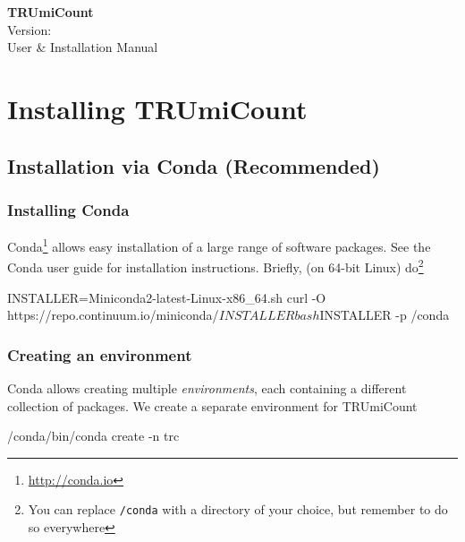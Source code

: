 \documentclass[10pt]{article}
\makeatletter
\newenvironment{shellcode}%
   {\bgroup\topsep=0pt\partopsep=0pt\shaded\verbatim}%
   {\endverbatim\endshaded\egroup}
\newcommand{\@version}{}
\newcommand{\printversion}{\@version}
\makeatother
\begin{document}
\begin{titlepage}
\vfill
{\sffamily\bfseries\Huge\centering%
TRUmiCount\\}
\vskip0.5cm
{\sffamily\large\centering%
Version: \printversion\\}
\vskip1.5cm
{\sffamily\huge\centering%
User \& Installation Manual\\}
\vskip4cm
\vfill
{\sffamily
\tableofcontents}
\vfill
\end{titlepage}



\newpage
\section{Installing TRUmiCount}

\subsection{Installation via Conda (Recommended)}

\subsubsection*{Installing Conda}

Conda\footnote{\url{http://conda.io}} allows easy installation of a large range of software packages. See the Conda user guide for installation instructions. Briefly, (on 64-bit Linux) do\footnote{You can replace \texttt{/conda} with a directory of your choice, but remember to do so everywhere}

\begin{shellcode}
INSTALLER=Miniconda2-latest-Linux-x86_64.sh
curl -O https://repo.continuum.io/miniconda/$INSTALLER
bash $INSTALLER -p /conda
\end{shellcode}

\subsubsection*{Creating an environment}

Conda allows creating multiple \emph{environments}, each containing a different collection of packages. We create a separate environment for TRUmiCount

\begin{shellcode}
/conda/bin/conda create -n trc
\end{shellcode}
\end{document}

